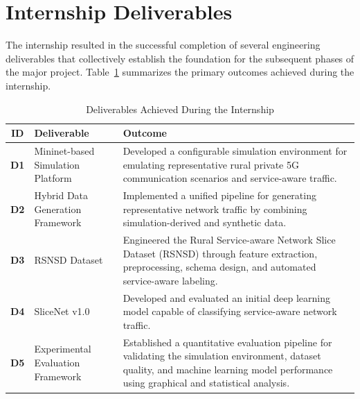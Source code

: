 \documentclass[12pt,a4paper]{report}
\begin{document}
	\section{Internship Deliverables}
	\label{sec:deliverables}
	
	The internship resulted in the successful completion of several engineering deliverables that collectively establish the foundation for the subsequent phases of the major project. Table~\ref{tab:deliverables} summarizes the primary outcomes achieved during the internship.
	
	\begin{table}[H]
		\centering
		\caption{Deliverables Achieved During the Internship}
		\label{tab:deliverables}
		
		\begin{tabular}{|c|p{6.5cm}|p{7.5cm}|}
			\hline
			
			\textbf{ID} &
			\textbf{Deliverable} &
			\textbf{Outcome}
			\\
			\hline
			
			\textbf{D1} &
			Mininet-based Simulation Platform &
			Developed a configurable simulation environment for emulating representative rural private 5G communication scenarios and service-aware traffic.
			\\
			\hline
			
			\textbf{D2} &
			Hybrid Data Generation Framework &
			Implemented a unified pipeline for generating representative network traffic by combining simulation-derived and synthetic data.
			\\
			\hline
			
			\textbf{D3} &
			RSNSD Dataset &
			Engineered the Rural Service-aware Network Slice Dataset (RSNSD) through feature extraction, preprocessing, schema design, and automated service-aware labeling.
			\\
			\hline
			
			\textbf{D4} &
			SliceNet v1.0 &
			Developed and evaluated an initial deep learning model capable of classifying service-aware network traffic.
			\\
			\hline
			
			\textbf{D5} &
			Experimental Evaluation Framework &
			Established a quantitative evaluation pipeline for validating the simulation environment, dataset quality, and machine learning model performance using graphical and statistical analysis.
			\\
			\hline
			
		\end{tabular}
		
	\end{table}
	
\end{document}
